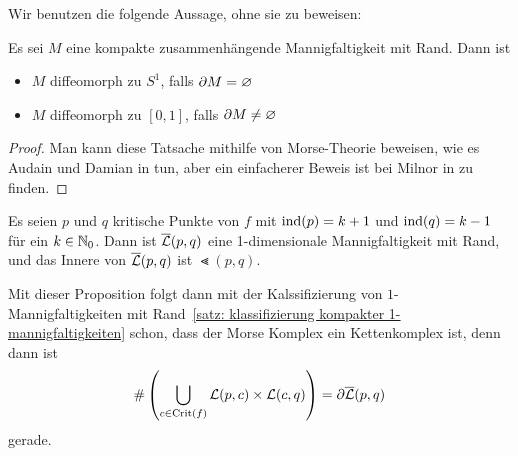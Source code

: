 Wir benutzen die folgende Aussage, ohne sie zu beweisen:

\begin{theorem}
    \label{satz: klassifizierung kompakter 1-mannigfaltigkeiten}
    Es sei $M$ eine kompakte zusammenhängende Mannigfaltigkeit mit Rand. Dann ist
    \begin{itemize}
        \item $M$ diffeomorph zu $S^1$, falls ${ \partial } M = \varnothing$
        \item $M$ diffeomorph zu $[0, 1]$, falls ${ \partial } M \neq \varnothing$
    \end{itemize}
\end{theorem}

\begin{proof}
    Man kann diese Tatsache mithilfe von Morse-Theorie beweisen, wie es Audain und Damian in 
    \cite{audin} tun, aber ein einfacherer Beweis ist bei Milnor in \cite{milnor2} zu finden.
\end{proof}

\begin{theorem}
    \label{satz: gebrochene trajektorien sind 1-dim mannigfaltigkeit}
    Es seien $p$ und $q$ kritische Punkte von $f$ mit ${ \operatorname{ind} } (p) = k + 1$ und ${ \operatorname{ind} } (q) = k - 1$
    für ein $k \in { \mathbb N }_0$. Dann ist ${\overline{\mathcal{L}} } (p, q)$ eine 1-dimensionale Mannigfaltigkeit mit Rand, und das
    Innere von ${\overline{\mathcal{L}} } (p, q)$ ist $\Lt (p, q)$.
\end{theorem}

Mit dieser Proposition folgt dann mit der Kalssifizierung von $1$-Mannigfaltigkeiten mit 
Rand~\ref{satz: klassifizierung kompakter 1-mannigfaltigkeiten} schon, dass der Morse Komplex ein
Kettenkomplex ist, denn dann ist 
\[ \# \left( \bigcup_{c \in { \operatorname{Crit} } (f)} { \mathcal{L} } (p, c) \times { \mathcal{L} } (c, q) \right) = { \partial } {\overline{\mathcal{L}} } (p, q) \]
gerade.

